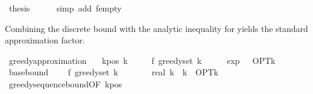 \begin{isabellebody}
\ {\isacharquery}{\kern0pt}thesis\isanewline
\ \ \ \ \isamarkupfalse%
\ {\isacharparenleft}{\kern0pt}simp\ add{\isacharcolon}{\kern0pt}\ f{\isacharunderscore}{\kern0pt}empty{\isacharparenright}{\kern0pt}\isanewline
{}\isamarkupfalse%
%
\endisatagproof
{\isafoldproof}%
%
\isadelimproof
%
\endisadelimproof
%
\begin{isamarkuptext}%
Combining the discrete bound with the analytic inequality for
   yields the standard  approximation factor.%
\end{isamarkuptext}\isamarkuptrue%
\isamarkupfalse%
\ greedy{\isacharunderscore}{\kern0pt}approximation{\isacharcolon}{\kern0pt}\isanewline
\ \ \ k{\isacharunderscore}{\kern0pt}pos{\isacharcolon}{\kern0pt}\ {\isachardoublequoteopen}k\ {\isachargreater}{\kern0pt}\ {}{\isachardoublequoteclose}\isanewline
\ \ \ {\isachardoublequoteopen}f\ {\isacharparenleft}{\kern0pt}greedy{\isacharunderscore}{\kern0pt}set\ k{\isacharparenright}{\kern0pt}\ {\isasymge}\ {\isacharparenleft}{\kern0pt}{}\ {\isacharminus}{\kern0pt}\ {}\ {\isacharslash}{\kern0pt}\ exp\ {}{\isacharparenright}{\kern0pt}\ {\isacharasterisk}{\kern0pt}\ OPT{\isacharunderscore}{\kern0pt}k{\isachardoublequoteclose}\isanewline
%
\isadelimproof
%
\endisadelimproof
%
\isatagproof
{}\isamarkupfalse%
\ {\isacharminus}{\kern0pt}\isanewline
\ \ \isamarkupfalse%
\ base{\isacharunderscore}{\kern0pt}bound{\isacharcolon}{\kern0pt}\isanewline
\ \ \ \ {\isachardoublequoteopen}f\ {\isacharparenleft}{\kern0pt}greedy{\isacharunderscore}{\kern0pt}set\ k{\isacharparenright}{\kern0pt}\ {\isasymge}\ {\isacharparenleft}{\kern0pt}{}\ {\isacharminus}{\kern0pt}\ {\isacharparenleft}{\kern0pt}{}\ {\isacharminus}{\kern0pt}\ {}\ {\isacharslash}{\kern0pt}\ real\ k{\isacharparenright}{\kern0pt}\ {\isacharcircum}{\kern0pt}\ k{\isacharparenright}{\kern0pt}\ {\isacharasterisk}{\kern0pt}\ OPT{\isacharunderscore}{\kern0pt}k{\isachardoublequoteclose}\isanewline
\ \ \ \ \isamarkupfalse%
\ greedy{\isacharunderscore}{\kern0pt}sequence{\isacharunderscore}{\kern0pt}bound{\isacharbrackleft}{\kern0pt}OF\ k{\isacharunderscore}{\kern0pt}pos{\isacharbrackright}{\kern0pt}\ \isakeywordONE{{\isachardot}{\kern0pt}}\isamarkupfalse%

\end{isabellebody}
